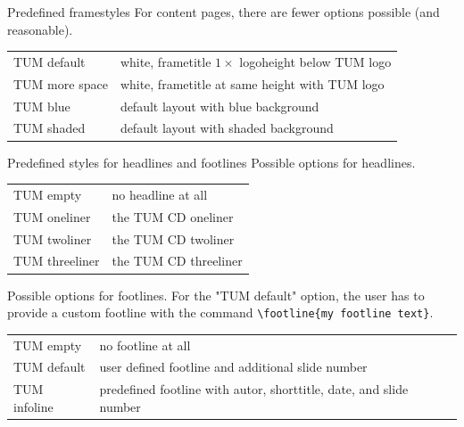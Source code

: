 \begin{frame}{Predefined framestyles}
  For content pages, there are fewer options possible (and reasonable).

  \vspace{3mm}
  \begin{tabular}{ll}
    TUM default    & white, frametitle $1\times$ logoheight below TUM logo \\
    TUM more space & white, frametitle at same height with TUM logo        \\
    TUM blue       & default layout with blue background                   \\
    TUM shaded     & default layout with shaded background                 \\
  \end{tabular}
\end{frame}

\begin{frame}[fragile]{Predefined styles for headlines and footlines}
  Possible options for headlines.

  \vspace{1mm}
  \begin{tabular}{ll}
    TUM empty      & no headline at all    \\
    TUM oneliner   & the TUM CD oneliner   \\
    TUM twoliner   & the TUM CD twoliner   \\
    TUM threeliner & the TUM CD threeliner \\
  \end{tabular}
  \vspace{3mm}

  Possible options for footlines. For the "TUM default" option, the user has
  to provide a custom footline with the command
  \lstinline|\footline{my footline text}|.

  \vspace{1mm}
  \begin{tabular}{ll}
    TUM empty    & no footline at all                                \\
    TUM default  & user defined footline and additional slide number \\
    TUM infoline & predefined footline with autor, shorttitle, date,
    and slide number                                                 \\
  \end{tabular}
\end{frame}

